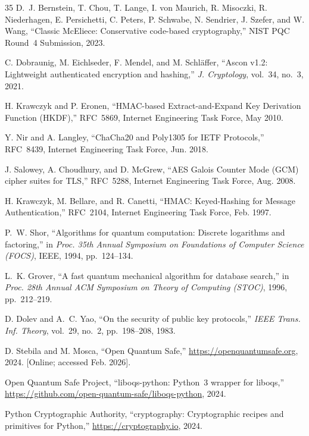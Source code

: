 \documentclass[conference]{IEEEtran}
\begin{document}
\begin{thebibliography}{35}
D.~J. Bernstein, T. Chou, T. Lange, I. von Maurich, R. Misoczki, R. Niederhagen, E. Persichetti, C. Peters, P. Schwabe, N. Sendrier, J. Szefer, and W. Wang, ``Classic McEliece: Conservative code-based cryptography,'' NIST PQC Round~4 Submission, 2023.

C. Dobraunig, M. Eichlseder, F. Mendel, and M. Schl{\"a}ffer, ``Ascon v1.2: Lightweight authenticated encryption and hashing,'' \emph{J. Cryptology}, vol.~34, no.~3, 2021.

H. Krawczyk and P. Eronen, ``HMAC-based Extract-and-Expand Key Derivation Function (HKDF),'' RFC~5869, Internet Engineering Task Force, May 2010.

Y. Nir and A. Langley, ``ChaCha20 and Poly1305 for IETF Protocols,'' RFC~8439, Internet Engineering Task Force, Jun. 2018.

J. Salowey, A. Choudhury, and D. McGrew, ``AES Galois Counter Mode (GCM) cipher suites for TLS,'' RFC~5288, Internet Engineering Task Force, Aug. 2008.

H. Krawczyk, M. Bellare, and R. Canetti, ``HMAC: Keyed-Hashing for Message Authentication,'' RFC~2104, Internet Engineering Task Force, Feb. 1997.

P.~W. Shor, ``Algorithms for quantum computation: Discrete logarithms and factoring,'' in \emph{Proc. 35th Annual Symposium on Foundations of Computer Science (FOCS)}, IEEE, 1994, pp.~124--134.

L.~K. Grover, ``A fast quantum mechanical algorithm for database search,'' in \emph{Proc. 28th Annual ACM Symposium on Theory of Computing (STOC)}, 1996, pp.~212--219.

D. Dolev and A.~C. Yao, ``On the security of public key protocols,'' \emph{IEEE Trans. Inf. Theory}, vol.~29, no.~2, pp.~198--208, 1983.

D. Stebila and M. Mosca, ``Open Quantum Safe,'' \url{https://openquantumsafe.org}, 2024. [Online; accessed Feb. 2026].

Open Quantum Safe Project, ``liboqs-python: Python~3 wrapper for liboqs,'' \url{https://github.com/open-quantum-safe/liboqs-python}, 2024.

Python Cryptographic Authority, ``cryptography: Cryptographic recipes and primitives for Python,'' \url{https://cryptography.io}, 2024.


\end{thebibliography}
\end{document}
